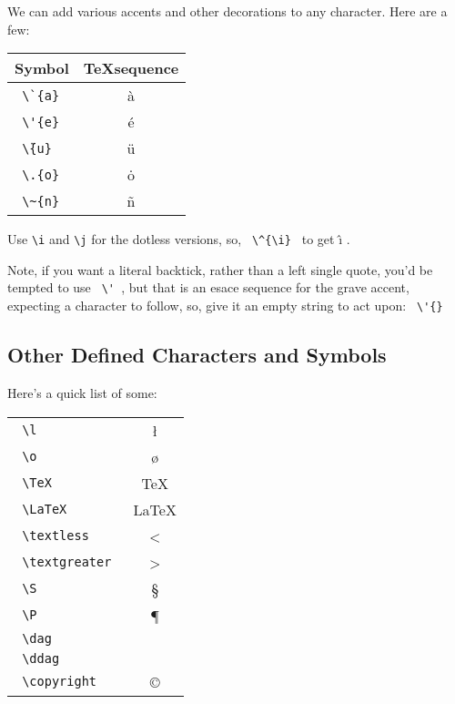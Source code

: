 We can add various accents and other decorations to any character.  Here are
a few:

\begin{center}
	\begin{tabular}{|l|c|}
		\hline
			\bf{Symbol} & \bf{\TeX sequence} \\
		\hline
		\texttt{ \textbackslash{}\`{}\{a\} } & \`{a} \\
		\texttt{ \textbackslash{}\'{}\{e\} } & \'{e} \\
		\texttt{ \textbackslash{}\"{}\{u\} } & \"{u} \\
		\texttt{ \textbackslash{}.\{o\} } & \.{o} \\
		\texttt{ \textbackslash{}\~{}\{n\} } & \~{n} \\
		\hline
	\end{tabular}
\end{center}

Use \texttt{\textbackslash{}i} and \texttt{\textbackslash{}j} for the dotless
versions, so, \texttt{ \textbackslash{}\^{}\{\textbackslash{}i\} } to get \^{\i} .

Note, if you want a literal backtick, rather than a left single quote, you'd
be tempted to use \texttt{ \textbackslash{}\'{} }, but that is an esace
sequence for the grave accent, expecting a character to follow, so, give it
an empty string to act upon: \texttt{ \textbackslash{}\'{}\{\} }


\subsection{Other Defined Characters and Symbols}

Here's a quick list of some:


\begin{center}
	\begin{tabular}{|lc|}
		\hline
		\texttt{ \textbackslash{}l } & \l \\
		\texttt{ \textbackslash{}o } & \o \\
		\texttt{ \textbackslash{}TeX } & \TeX \\
		\texttt{ \textbackslash{}LaTeX } & \LaTeX \\
		\texttt{ \textbackslash{}textless } & \textless \\
		\texttt{ \textbackslash{}textgreater } & \textgreater \\
		\texttt{ \textbackslash{}S } & \S \\
		\texttt{ \textbackslash{}P } & \P \\
		\texttt{ \textbackslash{}dag } & \dag \\
		\texttt{ \textbackslash{}ddag } & \ddag \\
		\texttt{ \textbackslash{}copyright } & \copyright \\
		\hline
	\end{tabular}
\end{center}


